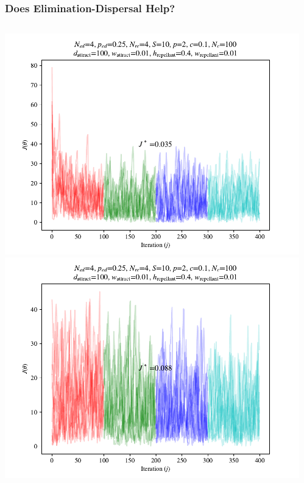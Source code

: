 \documentclass{beamer}
\begin{document}
\begin{frame}
\frametitle{Does Elimination-Dispersal Help?}
\begin{columns}
    \begin{center}
      \includegraphics[scale=0.3]{assets/rastrigin_colony_ed_0_J}
      \includegraphics[scale=0.3]{assets/rastrigin_colony_ed_1_J}
    \end{center}
  \begin{center}

\end{center}
\end{columns}
\end{frame}
\end{document}
